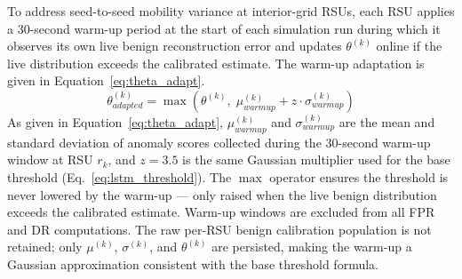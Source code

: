 \documentclass[12pt, a4paper]{report}
\begin{document}
To address seed-to-seed mobility variance at
interior-grid \ac{RSU}s, each \ac{RSU} applies a
30-second warm-up period at the start of each
simulation run during which it observes its own
live benign reconstruction error and updates
$\theta^{(k)}$ online if the live distribution
exceeds the calibrated estimate. The warm-up
adaptation is given in
Equation~\eqref{eq:theta_adapt}.
\begin{equation}
\theta^{(k)}_{adapted} =
\max\!\left(
\theta^{(k)},\;
\mu_{warmup}^{(k)} + z \cdot \sigma_{warmup}^{(k)}
\right)
\label{eq:theta_adapt}
\end{equation}
As given in Equation~\eqref{eq:theta_adapt},
$\mu_{warmup}^{(k)}$ and $\sigma_{warmup}^{(k)}$
are the mean and standard deviation of anomaly
scores collected during the 30-second warm-up
window at \ac{RSU} $r_k$, and $z = 3.5$ is the
same Gaussian multiplier used for the base
threshold (Eq.~\ref{eq:lstm_threshold}). The
$\max$ operator ensures the threshold is never
lowered by the warm-up — only raised when the
live benign distribution exceeds the calibrated
estimate. Warm-up windows are excluded from all
\ac{FPR} and \ac{DR} computations.
The raw per-RSU benign calibration population
is not retained; only $\mu^{(k)}$, $\sigma^{(k)}$,
and $\theta^{(k)}$ are persisted, making the
warm-up a Gaussian approximation consistent with
the base threshold formula.
\end{document}

